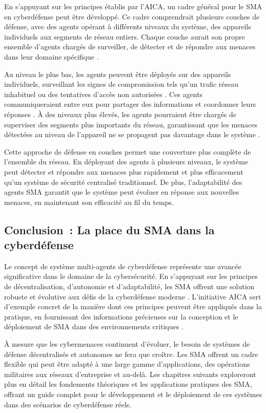 En s'appuyant sur les principes établis par l'AICA, un cadre général pour le SMA en cyberdéfense peut être développé. Ce cadre comprendrait plusieurs couches de défense, avec des agents opérant à différents niveaux du système, des appareils individuels aux segments de réseau entiers. Chaque couche aurait son propre ensemble d'agents chargés de surveiller, de détecter et de répondre aux menaces dans leur domaine spécifique \cite{bou-harb2017cyber}.

Au niveau le plus bas, les agents peuvent être déployés sur des appareils individuels, surveillant les signes de compromission tels qu'un trafic réseau inhabituel ou des tentatives d'accès non autorisées \cite{kolias2011swarm}. Ces agents communiqueraient entre eux pour partager des informations et coordonner leurs réponses \cite{shamshirband2018computational}. À des niveaux plus élevés, les agents pourraient être chargés de superviser des segments plus importants du réseau, garantissant que les menaces détectées au niveau de l'appareil ne se propagent pas davantage dans le système \cite{hu2018mimic}.

Cette approche de défense en couches permet une couverture plus complète de l'ensemble du réseau. En déployant des agents à plusieurs niveaux, le système peut détecter et répondre aux menaces plus rapidement et plus efficacement qu'un système de sécurité centralisé traditionnel. De plus, l'adaptabilité des agents SMA garantit que le système peut évoluer en réponse aux nouvelles menaces, en maintenant son efficacité au fil du temps.

\subsection{Conclusion : La place du SMA dans la cyberdéfense}

Le concept de système multi-agents de cyberdéfense représente une avancée significative dans le domaine de la cybersécurité. En s'appuyant sur les principes de décentralisation, d'autonomie et d'adaptabilité, les SMA offrent une solution robuste et évolutive aux défis de la cyberdéfense moderne \cite{kolias2011swarm}. L'initiative AICA sert d'exemple concret de la manière dont ces principes peuvent être appliqués dans la pratique, en fournissant des informations précieuses sur la conception et le déploiement de SMA dans des environnements critiques \cite{bou-harb2014cyber}.

À mesure que les cybermenaces continuent d'évoluer, le besoin de systèmes de défense décentralisés et autonomes ne fera que croître. Les SMA offrent un cadre flexible qui peut être adapté à une large gamme d'applications, des opérations militaires aux réseaux d'entreprise et au-delà. Les chapitres suivants exploreront plus en détail les fondements théoriques et les applications pratiques des SMA, offrant un guide complet pour le développement et le déploiement de ces systèmes dans des scénarios de cyberdéfense réels.



